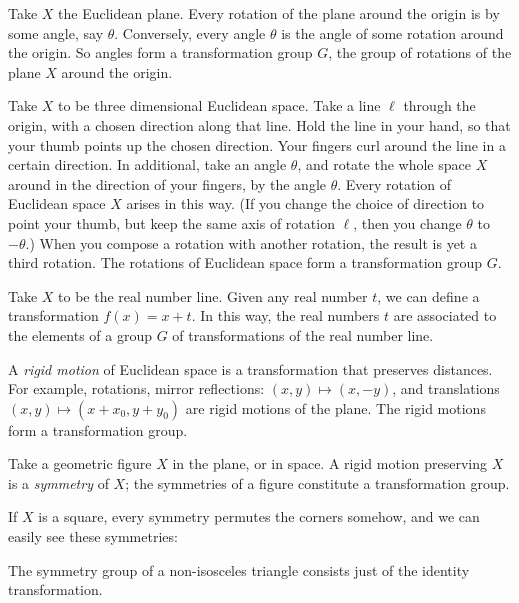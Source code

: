 \begin{example}
Take \(X\) the Euclidean plane.
Every rotation of the plane around the origin is by some angle, say \(\theta\).
Conversely, every angle \(\theta\) is the angle of some rotation around the origin.
So angles form a transformation group \(G\), the group of rotations of the plane \(X\) around the origin.
\end{example}
\begin{example}
Take \(X\) to be three dimensional Euclidean space.
Take a line \(\ell\) through the origin, with a chosen direction along that line.
Hold the line in your hand, so that your thumb points up the chosen direction.
Your fingers curl around the line in a certain direction.
In additional, take an angle \(\theta\), and rotate the whole space \(X\) around in the direction of your fingers, by the angle \(\theta\).
Every rotation of Euclidean space \(X\) arises in this way.
(If you change the choice of direction to point your thumb, but keep the same axis of rotation \(\ell\), then you change \(\theta\) to \(-\theta\).)
When you compose a rotation with another rotation, the result is yet a third rotation.
The rotations of Euclidean space form a transformation group \(G\).
\end{example}
\begin{example}
Take \(X\) to be the real number line. 
Given any real number \(t\), we can define a transformation \(f(x)=x+t\).
In this way, the real numbers \(t\) are associated to the elements of a group \(G\) of transformations of the real number line.
\end{example}
\begin{example}
A \emph{rigid motion} of Euclidean space is a transformation that preserves distances.
For example, rotations, mirror reflections: \((x,y) \mapsto (x,-y)\), and translations \((x,y) \mapsto (x+x_0,y+y_0)\) are rigid motions of the plane.
The rigid motions form a transformation group.
\end{example}
Take a geometric figure \(X\) in the plane, or in space.
A rigid motion preserving \(X\) is a \emph{symmetry} of \(X\); the symmetries of a figure constitute a transformation group.
\begin{example}
If \(X\) is a square, every symmetry permutes the corners somehow, and we can easily see these symmetries:
\begin{center}

\end{center}
\end{example}
\begin{example}
The symmetry group of a non-isosceles triangle consists just of the identity transformation.
\end{example}
